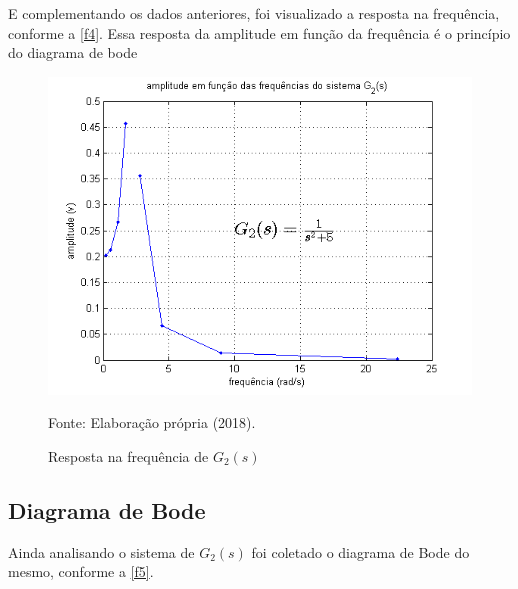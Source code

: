 E complementando os dados anteriores, foi visualizado a resposta na frequência, conforme a \autoref{f4}. Essa resposta da amplitude em função da frequência é o princípio do diagrama de bode
\\
\begin{figure}[h!]
    \centering
    \caption{Resposta na frequência de $G_2(s)$}
    \includegraphics[scale=0.55]{img/task_7_04.png}
    \label{f4}
    \begin{flushleft}
        Fonte: Elaboração própria (2018).
    \end{flushleft}
\end{figure}

\subsection{Diagrama de Bode}
Ainda analisando o sistema de $G_2(s)$ foi coletado o diagrama de Bode do mesmo, conforme a \autoref{f5}.

